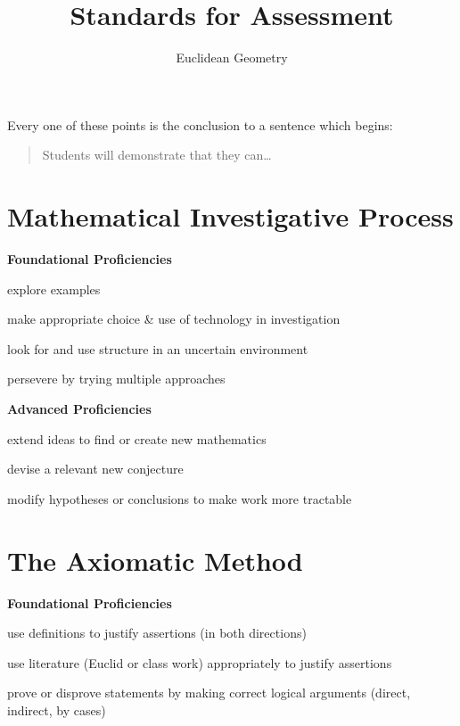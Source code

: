 \documentclass[11pt]{amsart}
\begin{document}
\title{Standards for Assessment}
\author{Euclidean Geometry}
\maketitle

Every one of these points is the conclusion to a sentence which begins:
\begin{quote}
    Students will demonstrate that they can\dots
\end{quote}

\section*{Mathematical Investigative Process}

\textbf{Foundational Proficiencies}
\begin{compactitem}
\item explore examples
\item make appropriate choice \& use of technology in investigation
\item look for and use structure in an uncertain environment
\item persevere by trying multiple approaches
\end{compactitem}

\textbf{Advanced Proficiencies}
\begin{compactitem}
\item extend ideas to find or create new mathematics
\item devise a relevant new conjecture
\item modify hypotheses or conclusions to make work more tractable
\end{compactitem}

\section*{The Axiomatic Method}

\textbf{Foundational Proficiencies}
\begin{compactitem}
\item use definitions to justify assertions (in both directions)
\item use literature (Euclid or class work) appropriately to justify assertions
\item prove or disprove statements by making correct logical arguments (direct, indirect, by cases)
\end{compactitem}
\end{document}

